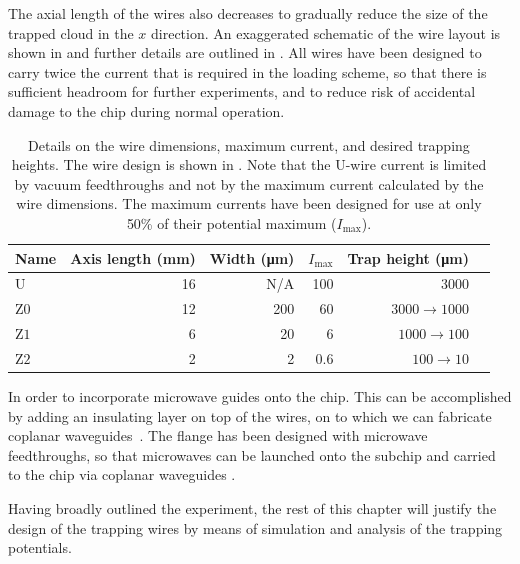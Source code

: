 The axial length of the wires also decreases to gradually reduce the size of
the trapped cloud in the $x$ direction. An exaggerated schematic of the wire
layout is shown in  and further details are
outlined in . All wires have been designed to
carry twice the current that is required in the loading scheme, so that there
is sufficient headroom for further experiments, and to reduce risk of
accidental damage to the chip during normal operation.

\begin{table}
  \centering
\begin{tabular}{lrrrrr}
  Name & Axis length (\si{\milli\meter}) & Width (\si{\micro\meter})& $I_\text{max}$ & Trap height (\si{\micro\meter}) \\
 \hline
  U & 16 & N/A& 100 & 3000\\
  $\mathrm{Z0}$ & 12 & 200& 60& $3000\rightarrow1000$ \\
  $\mathrm{Z1}$ &  6 & 20& 6& $1000\rightarrow100$ \\
  $\mathrm{Z2}$ &  2 & 2& 0.6& $100\rightarrow10$ \\
 \hline
\end{tabular}
  \caption{Details on the wire dimensions, maximum current, and desired
  trapping heights. The wire design is shown in
  . Note that the U-wire current is
  limited by vacuum feedthroughs and not by the maximum current calculated by
  the wire dimensions.  The maximum currents have been designed for use at only
  50\% of their potential maximum ($I_\text{max}$).
  }
  \label{overview:table:wires}
\end{table}


In order to incorporate microwave guides onto the chip. This can be
accomplished by adding an insulating layer on top of the wires, on to which we
can fabricate coplanar waveguides~\cite{1127105}. The flange has been designed
with microwave feedthroughs, so that microwaves can be launched onto the
subchip and carried to the chip via coplanar waveguides .

Having broadly outlined the experiment, the rest of this chapter will justify
the design of the trapping wires by means of simulation and analysis
of the trapping potentials.

